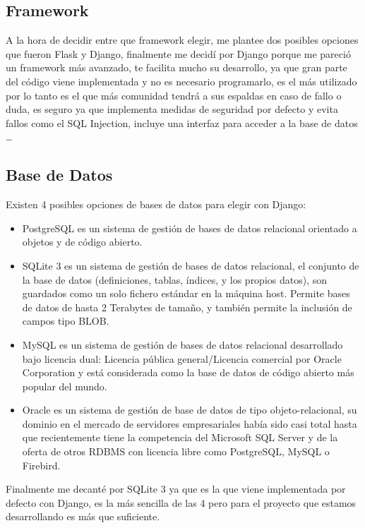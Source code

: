 \subsection{Framework}

A la hora de decidir entre que framework elegir, me plantee dos posibles opciones que fueron Flask\cite{Flask} y Django\cite{Django}, finalmente me decidí por Django porque me pareció un framework más avanzado, te facilita mucho su desarrollo, ya que gran parte del código viene implementada y no es necesario programarlo, es el más utilizado por lo tanto es el que más comunidad tendrá a sus espaldas en caso de fallo o duda, es seguro ya que implementa medidas de seguridad por defecto y evita fallos como el SQL Injection, incluye una interfaz para acceder a la base de datos \ldots


\subsection{Base de Datos}

Existen 4 posibles opciones de bases de datos para elegir con Django:
	\begin{itemize}
	\item PostgreSQL\cite{PostgreSQL} es un sistema de gestión de bases de datos relacional orientado a objetos y de código abierto. 
	\item SQLite 3\cite{SQLite3} es un sistema de gestión de bases de datos relacional, el conjunto de la base de datos (definiciones, tablas, índices, y los propios datos), son guardados como un solo fichero estándar en la máquina host. Permite bases de datos de hasta 2 Terabytes de tamaño, y también permite la inclusión de campos tipo BLOB.
	\item MySQL\cite{MySQL} es un sistema de gestión de bases de datos relacional desarrollado bajo licencia dual: Licencia pública general/Licencia comercial por Oracle Corporation y está considerada como la base de datos de código abierto más popular del mundo.
	\item Oracle\cite{Oracle} es un sistema de gestión de base de datos de tipo objeto-relacional, su dominio en el mercado de servidores empresariales había sido casi total hasta que recientemente tiene la competencia del Microsoft SQL Server y de la oferta de otros RDBMS con licencia libre como PostgreSQL, MySQL o Firebird.
	\end{itemize}

Finalmente me decanté por SQLite 3 ya que es la que viene implementada por defecto con Django, es la más sencilla de las 4 pero para el proyecto que estamos desarrollando es más que suficiente.

